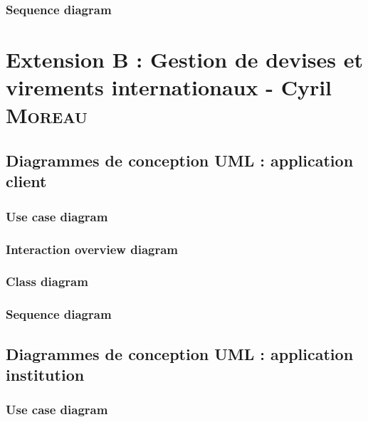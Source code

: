 \documentclass[]{report}
\begin{document}
\subsection{Sequence diagram}

\newpage





\chapter{Extension B : Gestion de devises et virements internationaux - Cyril \textsc{Moreau}}



\newpage



\section{Diagrammes de conception UML : application client}



\subsection{Use case diagram}

\newpage

\subsection{Interaction overview diagram}

\newpage

\subsection{Class diagram}

\newpage

\subsection{Sequence diagram}

\newpage



\section{Diagrammes de conception UML : application institution}



\subsection{Use case diagram}
\end{document}
